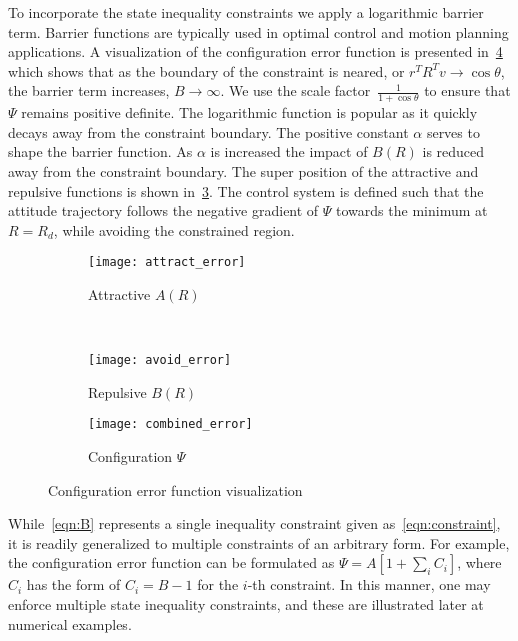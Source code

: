 \documentclass[letterpaper, 10 pt, conference]{ieeeconf}  %
\begin{document}
To incorporate the state inequality constraints we apply a logarithmic barrier term.
Barrier functions are typically used in optimal control and motion planning applications.
A visualization of the configuration error function is presented in~\cref{fig:config_error} which shows that as the boundary of the constraint is neared, or \( r^T R^T v \to \cos \theta \), the barrier term increases, \( B \to \infty\).
We use the scale factor~\(\frac{1}{1+\cos \theta} \) to ensure that \( \Psi \) remains positive definite.
The logarithmic function is popular as it quickly decays away from the constraint boundary.
The positive constant \( \alpha \) serves to shape the barrier function.
As \( \alpha \) is increased the impact of \( B(R) \) is reduced away from the constraint boundary. 
The super position of the attractive and repulsive functions is shown in~\cref{fig:combined_error}.
The control system is defined such that the attitude trajectory follows the negative gradient of \( \Psi \) towards the minimum at \( R = R_d \), while avoiding the constrained region.
\begin{figure} 
	\centering 
	\begin{subfigure}[htbp]{0.45\columnwidth} 
		\texttt{[image: attract\_error]} 
		\caption{Attractive \( A(R) \) } \label{fig:attract_error} 
	\end{subfigure}~ %
	\begin{subfigure}[htbp]{0.45\columnwidth} 
		\texttt{[image: avoid\_error]} 
		\caption{Repulsive \( B(R) \)} \label{fig:avoid_error} 
	\end{subfigure}
	\centering
	\begin{subfigure}[htbp]{0.45\columnwidth} 
		\texttt{[image: combined\_error]} 
		\caption{Configuration \( \Psi \)} \label{fig:combined_error} 
	\end{subfigure}
	\caption{Configuration error function visualization}
	\label{fig:config_error} 
\end{figure}

While~\cref{eqn:B} represents a single inequality constraint given as~\cref{eqn:constraint}, it is readily generalized to multiple constraints of an arbitrary form. 
For example, the configuration error function can be formulated as $\Psi=A[1+\sum_i C_i]$, where $C_i$ has the form of $C_i=B-1$ for the $i$-th constraint. 
In this manner, one may enforce multiple state inequality constraints, and these are illustrated later at numerical examples. 
\end{document}
